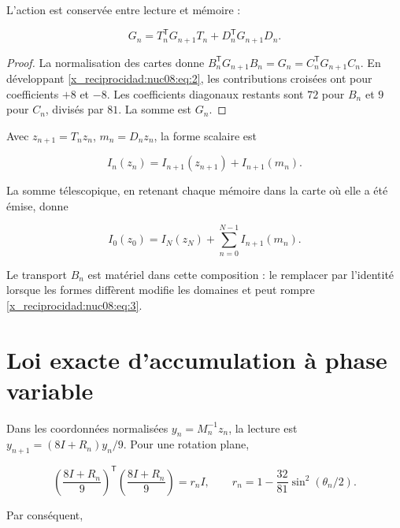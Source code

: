 \begin{theorem}
L’action est conservée entre lecture et mémoire :

\begin{equation}
\boxed{G_n=T_n^\mathsf TG_{n+1}T_n+D_n^\mathsf TG_{n+1}D_n.}
\label{x_reciprocidad:nuc08:eq:3}
\end{equation}
\end{theorem}

\begin{proof}
La normalisation des cartes donne
\(B_n^\mathsf TG_{n+1}B_n=G_n=C_n^\mathsf TG_{n+1}C_n\).
En développant \eqref{x_reciprocidad:nuc08:eq:2}, les contributions croisées ont pour coefficients \(+8\) et \(-8\). Les coefficients diagonaux restants sont \(72\) pour \(B_n\) et \(9\) pour \(C_n\), divisés par \(81\). La somme est \(G_n\).
\end{proof}

Avec \(z_{n+1}=T_nz_n\), \(m_n=D_nz_n\), la forme scalaire est

\begin{equation}
\boxed{I_n(z_n)=I_{n+1}(z_{n+1})+I_{n+1}(m_n).}
\label{x_reciprocidad:nuc08:eq:4}
\end{equation}

La somme télescopique, en retenant chaque mémoire dans la carte où elle a été émise, donne

\begin{equation}
I_0(z_0)=I_N(z_N)+\sum_{n=0}^{N-1}I_{n+1}(m_n).
\label{x_reciprocidad:nuc08:eq:5}
\end{equation}

Le transport \(B_n\) est matériel dans cette composition : le remplacer par l’identité lorsque les formes diffèrent modifie les domaines et peut rompre \eqref{x_reciprocidad:nuc08:eq:3}.

\section{Loi exacte d’accumulation à phase variable}

Dans les coordonnées normalisées \(y_n=M_n^{-1}z_n\), la lecture est
\(y_{n+1}=(8I+R_n)y_n/9\). Pour une rotation plane,

\begin{equation}
\left(\frac{8I+R_n}{9}\right)^\mathsf T
\left(\frac{8I+R_n}{9}\right)=r_n I,\qquad
r_n=1-\frac{32}{81}\sin^2(\theta_n/2).
\label{x_reciprocidad:nuc08:eq:6}
\end{equation}

Par conséquent,

